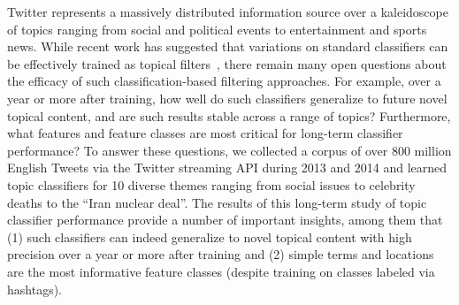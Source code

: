 
Twitter represents a massively distributed information source over a kaleidoscope of topics ranging from social and political events to entertainment and sports news.  While recent work has suggested that variations on standard classifiers can be effectively trained as topical filters~\cite{lin2011smoothing,yang2014large,magdy}, there remain many open questions about the efficacy of such classification-based filtering approaches.  For example, over a year or more after training, how well do such classifiers generalize to future novel topical content, and are such results stable across a range of topics?  Furthermore, what features and feature classes are most critical for long-term classifier performance?  To answer these questions, we collected a corpus of over 800 million English Tweets via the Twitter streaming API during 2013 and 2014 and learned topic classifiers for 10 diverse themes ranging from social issues to celebrity deaths to the ``Iran nuclear deal''.  The results of this long-term study of topic classifier performance provide a number of important insights, among them that (1) such classifiers can indeed generalize to novel topical content with high precision over a year or more after training and (2) simple terms and locations are the most informative feature classes (despite training on classes labeled via hashtags).  
